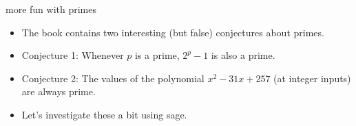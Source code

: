 \documentclass[landscape]{beamer}
\begin{document}
\begin{frame}{more fun with primes}
\begin{itemize}
\item The book contains two interesting (but false) conjectures about primes. \pause
\item Conjecture 1: Whenever $p$ is a prime, $2^p-1$ is also a prime. \pause
\item Conjecture 2: The values of the polynomial $x^2-31x+257$ (at integer inputs) are always prime.\pause
\item Let's investigate these a bit using sage. 
\end{itemize}
\end{frame}
\end{document}
